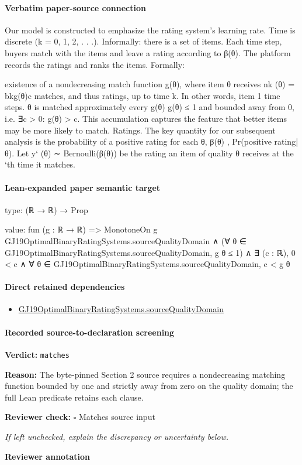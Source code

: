 \documentclass[10pt]{article}
\newcommand{\reviewerbox}{%
  \par\noindent\fbox{\parbox{0.96\linewidth}{\rule{0pt}{0.38in}}}\par
}
\newcommand{\reviewmatch}[1]{%
  \par\noindent\textbf{Reviewer check:} $\square$\; #1\par
  \noindent\emph{If left unchecked, explain the discrepancy or uncertainty below.}\par
}
\begin{document}
\paragraph{Verbatim paper-source connection}
\begin{ReviewVerbatim}
Our model is constructed to emphasize the rating system’s learning rate. Time is discrete (k =
0, 1, 2, . . .). Informally: there is a set of items. Each
time step, buyers match with the items and leave a
rating according to β(θ). The platform records the
ratings and ranks the items. Formally:

existence of a nondecreasing match function g(θ),
where item θ receives nk (θ) = bkg(θ)c matches, and
thus ratings, up to time k. In other words, item
1
time steps.
θ is matched approximately every g(θ)
g(θ) ≤ 1 and bounded away from 0, i.e. ∃c > 0:
g(θ) > c. This accumulation captures the feature
that better items may be more likely to match.
Ratings. The key quantity for our subsequent
analysis is the probability of a positive rating for
each θ, β(θ) , Pr(positive rating|θ). Let y` (θ) ∼
Bernoulli(β(θ)) be the rating an item of quality θ
receives at the `th time it matches.
\end{ReviewVerbatim}



\paragraph{Lean-expanded paper semantic target}
\begin{ReviewVerbatim}
type:
(ℝ → ℝ) → Prop

value:
fun (g : ℝ → ℝ) =>
  MonotoneOn g GJ19OptimalBinaryRatingSystems.sourceQualityDomain ∧
    (∀ θ ∈ GJ19OptimalBinaryRatingSystems.sourceQualityDomain, g θ ≤ 1) ∧
      ∃ (c : ℝ), 0 < c ∧ ∀ θ ∈ GJ19OptimalBinaryRatingSystems.sourceQualityDomain, c < g θ
\end{ReviewVerbatim}

\paragraph{Direct retained dependencies}
\begin{itemize}\raggedright
\item \hyperlink{paper-prerequisite-af47d0cb57cea27a}{GJ19\allowbreak{}Optimal\allowbreak{}Binary\allowbreak{}Rating\allowbreak{}Systems.\allowbreak{}source\allowbreak{}Quality\allowbreak{}Domain}
\end{itemize}
\paragraph{Recorded source-to-declaration screening}
\textbf{Verdict:} \texttt{matches}
\\
{\raggedright
\textbf{Reason:} The byte-\allowbreak{}pinned Section 2 source requires a nondecreasing matching function bounded by one and strictly away from zero on the quality domain;\allowbreak{} the full Lean predicate retains each clause.\allowbreak{}
\par}
\reviewmatch{Matches source input}
\noindent\textbf{Reviewer annotation}\par
\reviewerbox
\clearpage
\hypertarget{paper-prerequisite-191bf99db32825ac}{}
\end{document}
